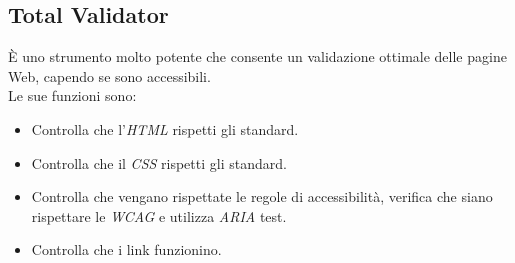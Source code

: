 \subsection{Total Validator}
È uno strumento molto potente che consente un validazione ottimale delle pagine Web, capendo se sono accessibili.\\
Le sue funzioni sono:
\begin{itemize}
	\item Controlla che l'\emph{HTML} rispetti gli standard.
	\item Controlla che il \emph{CSS} rispetti gli standard.
	\item Controlla che vengano rispettate le regole di accessibilità, verifica che siano rispettare le \emph{WCAG} e utilizza \emph{ARIA} test.
	\item Controlla che i link funzionino.
\end{itemize}